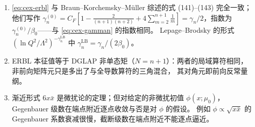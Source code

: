 \begin{remark}[与文献的对照及若干说明]\label{rem:cex-erbl-lit}
\begin{enumerate}[label=(\roman*)]
\item \cref{eq:cex-erbl} 与 Braun--Korchemsky--Müller 综述的式 (141)--(143) 完全一致；他们写作
$\gamma^{(0)}_n=C_F[1-\frac2{(n+1)(n+2)}+4\sum_{m=2}^{n+1}\frac1m]=\gamma_n/2$，指数为 $\gamma^{(0)}_n/\beta_0$——与 \cref{eq:cex-gamman} 的指数相同。
Lepage--Brodsky 的形式 $(\ln Q^2/\Lambda^2)^{-\gamma_n^{\mathrm{LB}}}$ 中 $\gamma_n^{\mathrm{LB}}=\gamma_n/(2\beta_0)$。
\item ERBL 本征值等于 DGLAP 非单态矩（$N=n+1$）：两者的局域算符相同，非前向矩阵元只是多出了与全导数算符的三角混合，
其对角元即前向反常量纲。
\item 渐近形式 $6x\bar x$ 是微扰论的定理；但对给定的非微扰初值 $\phi(x;\mu_0)$，Gegenbauer 级数在端点附近逐点收敛与否是对 $\phi$ 的假设。
例如 $\phi\propto\sqrt{x\bar x}$ 的 Gegenbauer 系数衰减很慢，截断级数在端点附近不能逐点逼近。
\end{enumerate}
\end{remark}
